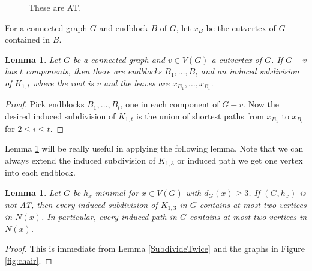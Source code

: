 \documentclass[12pt]{article}
\theoremstyle{plain}
\newtheorem{lem}[thm]{Lemma}
\theoremstyle{definition}
\theoremstyle{remark}
\begin{document}
\begin{figure}
			\caption{These are AT.}
			\label{fig:thebiggerones}
\end{figure}

For a connected graph $G$ and endblock $B$ of $G$, let $x_B$ be the cutvertex of $G$ contained in $B$.

\begin{lem}\label{InducedPathExists}
	Let $G$ be a connected graph and $v \in V(G)$ a cutvertex of $G$.  If $G-v$ has $t$ components, then there are endblocks $B_1, \ldots, B_t$ and an induced subdivision of $K_{1,t}$ where the root is $v$ and the leaves are $x_{B_1}, \ldots, x_{B_t}$.
\end{lem}
\begin{proof}
	Pick endblocks $B_1, \ldots, B_t$, one in each component of $G-v$.  Now the desired induced subdivision of $K_{1,t}$ is the union of shortest paths from $x_{B_1}$ to $x_{B_i}$ for $2 \le i \le t$. 
\end{proof}

Lemma \ref{InducedPathExists} will be really useful in applying the following lemma.  Note that we can always extend the induced subdivision of $K_{1,3}$ or induced path we get one vertex into each endblock.

\begin{lem}\label{NoClawBusiness}
	Let $G$ be $h_x$-minimal for $x \in V(G)$ with $d_G(x) \ge 3$.  If $(G,h_x)$ is not AT, then every induced subdivision of $K_{1,3}$ in $G$ contains at most two vertices in $N(x)$.  In particular, every induced path in $G$ contains at most two vertices in $N(x)$.
\end{lem}
\begin{proof}
	This is immediate from Lemma \ref{SubdivideTwice} and the graphs in Figure \ref{fig:chair}.
\end{proof}
\end{document}
